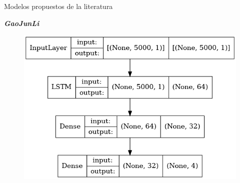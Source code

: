 \begin{frame}{Modelos propuestos de la literatura}
\begin{overprint}
            \begin{center}
                {\color{TurkishRose} \textbf{\textit{GaoJunLi}}}
            \end{center}
            \begin{figure}
                \centering
                \includegraphics[keepaspectratio=true,height=0.6\paperheight,width=0.7\paperwidth]{Images/GaoJunLin.png}
            \end{figure}
    \end{overprint}
\end{frame} 


